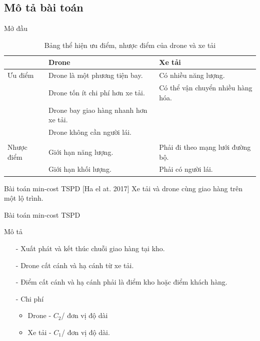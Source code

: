 \documentclass[compress]{beamer}
\begin{document}
\subsection{Mô tả bài toán}
\begin{frame}{Mở đầu}
\footnotesize
\begin{longtable}{|l|p{4.2cm}|p{4.2cm}|}
\caption{Bảng thể hiện ưu điểm, nhược điểm của drone và xe tải}
\label{undronexetai}\\
\toprule
&Drone& Xe tải \\
\midrule
\toprule

Ưu điểm & Drone là một phương tiện bay. &Có nhiều năng lượng.\\
& Drone tốn ít chi phí hơn xe tải. &Có thể vận chuyển nhiều hàng hóa.\\
& Drone bay giao hàng nhanh hơn xe tải.&\\
& Drone không cần người lái.&\\
\\
\hline
Nhược điểm & 
 Giới hạn năng lượng. & Phải đi theo mạng lưới đường bộ.\\
& Giới hạn khối lượng.& Phải có người lái. \\
\hline
\end{longtable}
\normalsize
\begin{block}{Bài toán min-cost TSPD [Ha el at. 2017]}
Xe tải và drone cùng giao hàng trên một lộ trình.
\end{block}
\end{frame}
\begin{frame}{Bài toán min-cost TSPD}
\begin{block}{Mô tả}
\begin{itemize}
\item[-] Xuất phát và kết thúc chuỗi giao hàng tại kho.
\item[-] Drone cất cánh và hạ cánh từ xe tải.
\item[-] Điểm cất cánh và hạ cánh phải là điểm kho hoặc điểm khách hàng.
\item[-] Chi phí \begin{itemize}
\item Drone - $C_2$/ đơn vị độ dài
\item Xe tải - $C_1$/ đơn vị độ dài.
\end{itemize}
\end{itemize}
\end{block}
\end{frame}
\end{document}
